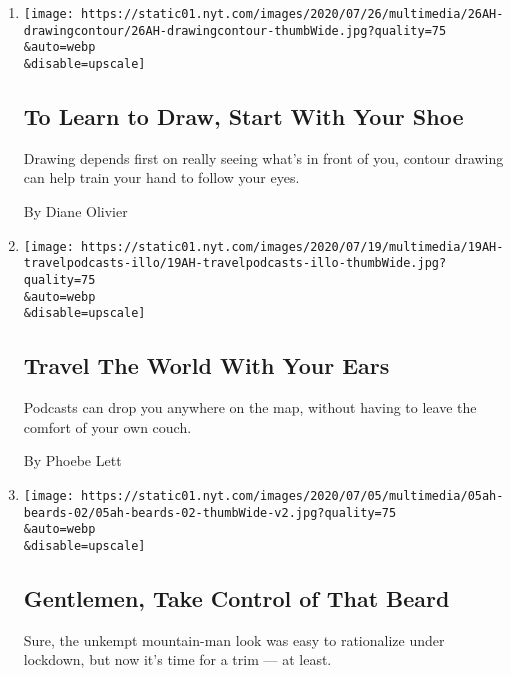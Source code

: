 \begin{enumerate}
\def\labelenumi{\arabic{enumi}.}
\item
  \href{/2020/07/25/at-home/coronavirus-learn-to-draw.html}{}

  \texttt{[image: https://static01.nyt.com/images/2020/07/26/multimedia/26AH-drawingcontour/26AH-drawingcontour-thumbWide.jpg?quality=75\\\&auto=webp\\\&disable=upscale]}

  \hypertarget{to-learn-to-draw-start-with-your-shoe}{%
  \subsection{To Learn to Draw, Start With Your
  Shoe}\label{to-learn-to-draw-start-with-your-shoe}}

  Drawing depends first on really seeing what's in front of you, contour
  drawing can help train your hand to follow your eyes.

  By Diane Olivier
\item
  \href{/2020/07/18/at-home/coronavirus-travel-podcasts.html}{}

  \texttt{[image: https://static01.nyt.com/images/2020/07/19/multimedia/19AH-travelpodcasts-illo/19AH-travelpodcasts-illo-thumbWide.jpg?quality=75\\\&auto=webp\\\&disable=upscale]}

  \hypertarget{travel-the-world-with-your-ears}{%
  \subsection{Travel The World With Your
  Ears}\label{travel-the-world-with-your-ears}}

  Podcasts can drop you anywhere on the map, without having to leave the
  comfort of your own couch.

  By Phoebe Lett
\item
  \href{/2020/07/03/at-home/coronavirus-beards.html}{}

  \texttt{[image: https://static01.nyt.com/images/2020/07/05/multimedia/05ah-beards-02/05ah-beards-02-thumbWide-v2.jpg?quality=75\\\&auto=webp\\\&disable=upscale]}

  \hypertarget{gentlemen-take-control-of-that-beard}{%
  \subsection{Gentlemen, Take Control of That
  Beard}\label{gentlemen-take-control-of-that-beard}}

  Sure, the unkempt mountain-man look was easy to rationalize under
  lockdown, but now it's time for a trim --- at least.


\end{enumerate}
